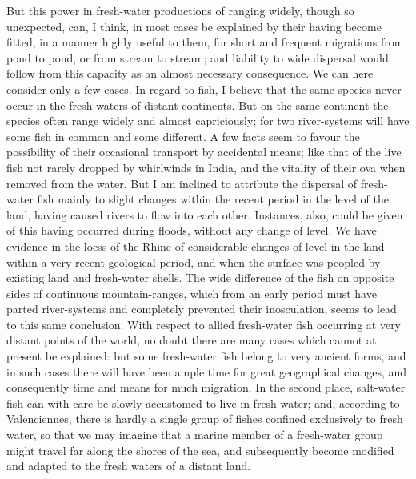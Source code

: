 \indent But this power in fresh-water productions of ranging widely, though so unexpected, can, I think, in most cases be explained by their having become fitted, in a manner highly useful to them, for short and frequent migrations from pond to pond, or from stream to stream; and liability to wide dispersal would follow from this capacity as an almost necessary consequence. We can here consider only a few cases. In regard to fish, I believe that the same species never occur in the fresh waters of distant continents. But on the same continent the species often range widely and almost capriciously; for two river-systems will have some fish in common and some different. A few facts seem to favour the possibility of their occasional transport by accidental means; like that of the live fish not rarely dropped by whirlwinds in India, and the vitality of their ova when removed from the water.  But I am inclined to attribute the dispersal of fresh-water fish mainly to slight changes within the recent period in the level of the land, having caused rivers to flow into each other. Instances, also, could be given of this having occurred during floods, without any change of level. We have evidence in the loess of the Rhine of considerable changes of level in the land within a very recent geological period, and when the surface was peopled by existing land and fresh-water shells. The wide difference of the fish on opposite sides of continuous mountain-ranges, which from an early period must have parted river-systems and completely prevented their inosculation, seems to lead to this same conclusion. With respect to allied fresh-water fish occurring at very distant points of the world, no doubt there are many cases which cannot at present be explained: but some fresh-water fish belong to very ancient forms, and in such cases there will have been ample time for great geographical changes, and consequently time and means for much migration. In the second place, salt-water fish can with care be slowly accustomed to live in fresh water; and, according to Valenciennes, there is hardly a single group of fishes confined exclusively to fresh water, so that we may imagine that a marine member of a fresh-water group might travel far along the shores of the sea, and subsequently become modified and adapted to the fresh waters of a distant land.~\\
